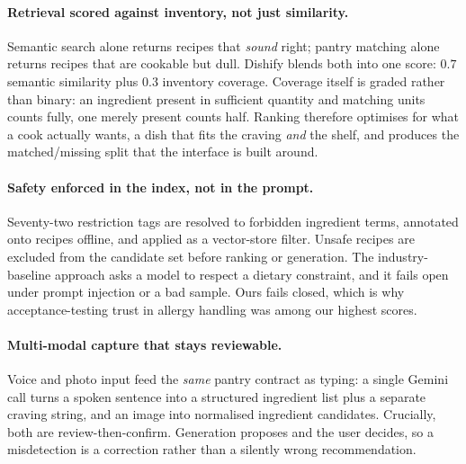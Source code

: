 \paragraph{Retrieval scored against inventory, not just similarity.}
Semantic search alone returns recipes that \emph{sound} right; pantry matching
alone returns recipes that are cookable but dull. Dishify blends both into one
score: $0.7$ semantic similarity plus $0.3$ inventory coverage. Coverage itself
is graded rather than binary: an ingredient present in
sufficient quantity and matching units counts fully, one merely present counts
half. Ranking therefore optimises for what a cook actually wants, a dish that
fits the craving \emph{and} the shelf, and produces the matched/missing split
that the interface is built around.

\paragraph{Safety enforced in the index, not in the prompt.}
Seventy-two restriction tags are resolved to forbidden ingredient terms,
annotated onto recipes offline, and applied as a vector-store filter. Unsafe
recipes are excluded from the candidate set before ranking or generation. The
industry-baseline approach asks a model to respect a dietary constraint, and it
fails open under prompt injection or a bad sample. Ours fails closed, which is
why acceptance-testing trust in allergy handling was among our highest
scores.

\paragraph{Multi-modal capture that stays reviewable.}
Voice and photo input feed the \emph{same} pantry contract as typing: a single
Gemini call turns a spoken sentence into a structured ingredient list plus a
separate craving string, and an image into normalised ingredient candidates.
Crucially, both are review-then-confirm. Generation proposes and the user
decides, so a misdetection is a correction rather than a silently wrong
recommendation.

